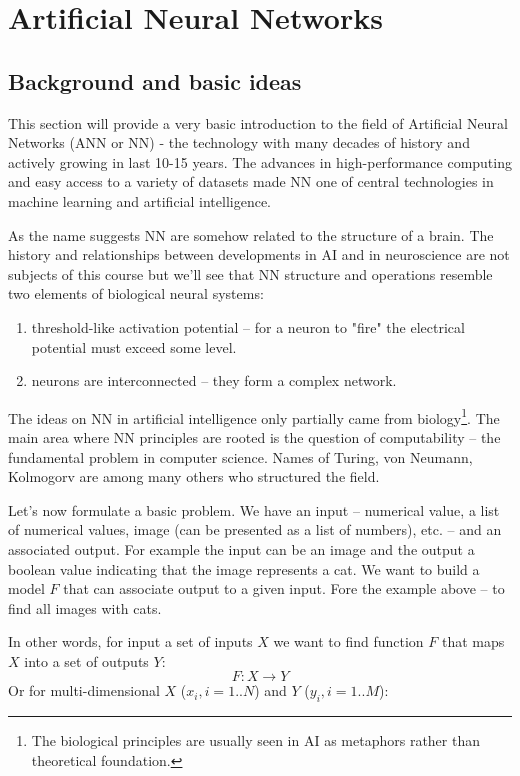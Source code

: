 \chapter{Artificial Neural Networks}

\section{Background and basic ideas}

This section will provide a very basic introduction to the
field of Artificial Neural Networks (ANN or NN) - the technology
with many decades of history and actively growing in last 10-15 years.
The advances in high-performance computing and easy access
to a variety of datasets made NN one of central technologies
in machine learning and artificial intelligence.

As the name suggests NN are somehow related to the structure of a brain.
The history and relationships between developments in AI and in
neuroscience are not subjects of this course but we'll see that NN
structure and operations resemble two elements of biological
neural systems:

\begin{enumerate}
\item threshold-like activation potential -- for a neuron to "fire"
the electrical potential must exceed some level.
\item neurons are interconnected -- they form a complex network.
\end{enumerate}

The ideas on NN in artificial intelligence only partially came from
biology\footnote{The biological principles are usually seen in AI as
metaphors rather than theoretical foundation.}. The main area
where NN principles are rooted is the question of computability --
the fundamental problem in computer science. Names of Turing,
von Neumann, Kolmogorv are among many others who structured the field.

Let's now formulate a basic problem. We have an input -- numerical value,
a list of numerical values, image (can be presented as a list of numbers),
etc. -- and an associated output. For example the input can be an image
and the output a boolean value indicating that the image represents a cat.
We want to build a model $F$ that can associate output to a given input.
Fore the example above -- to find all images with cats.

In other words, for input a set of inputs $X$ we want to find
function $F$ that maps $X$ into a set of outputs $Y$:
$$
F: X \rightarrow Y
$$
Or for multi-dimensional $X$ (${x_i}, i=1..N$) and $Y$ (${y_i}, i=1..M$):

